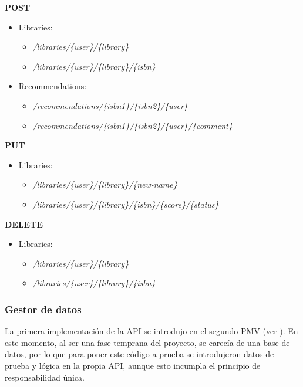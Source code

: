 \textbf{POST}
\begin{itemize}
    \item Libraries:
    \begin{itemize}
        \item \textit{/libraries/\{user\}/\{library\}}
        \item \textit{/libraries/\{user\}/\{library\}/\{isbn\}}
    \end{itemize}
    \item Recommendations:
    \begin{itemize}
        \item \textit{/recommendations/\{isbn1\}/\{isbn2\}/\{user\}}
        \item \textit{/recommendations/\{isbn1\}/\{isbn2\}/\{user\}/\{comment\}}
    \end{itemize}
\end{itemize}

\textbf{PUT}
\begin{itemize}
    \item Libraries:
    \begin{itemize}
        \item \textit{/libraries/\{user\}/\{library\}/\{new-name\}}
        \item \textit{/libraries/\{user\}/\{library\}/\{isbn\}/\{score\}/\{status\}}
    \end{itemize}
\end{itemize}

\textbf{DELETE}
\begin{itemize}
    \item Libraries:
    \begin{itemize}
        \item \textit{/libraries/\{user\}/\{library\}}
        \item \textit{/libraries/\{user\}/\{library\}/\{isbn\}}
    \end{itemize}
\end{itemize}

\subsubsection{Gestor de datos}

La primera implementación de la API se introdujo en el segundo PMV (ver ). En este momento, al ser una fase temprana del proyecto, se carecía de una base de datos, por lo que para poner este código a prueba se introdujeron datos de prueba y lógica en la propia API, aunque esto incumpla el principio de responsabilidad única.

